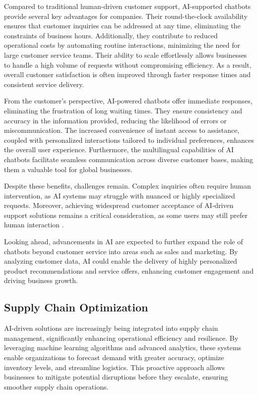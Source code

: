 Compared to traditional human-driven customer support, AI-supported chatbots provide several key advantages for companies. Their round-the-clock availability ensures that customer inquiries can be addressed at any time, eliminating the constraints of business hours. Additionally, they contribute to reduced operational costs by automating routine interactions, minimizing the need for large customer service teams. Their ability to scale effortlessly allows businesses to handle a high volume of requests without compromising efficiency. As a result, overall customer satisfaction is often improved through faster response times and consistent service delivery.  

From the customer's perspective, AI-powered chatbots offer immediate responses, eliminating the frustration of long waiting times. They ensure consistency and accuracy in the information provided, reducing the likelihood of errors or miscommunication. The increased convenience of instant access to assistance, coupled with personalized interactions tailored to individual preferences, enhances the overall user experience. Furthermore, the multilingual capabilities of AI chatbots facilitate seamless communication across diverse customer bases, making them a valuable tool for global businesses.  

Despite these benefits, challenges remain. Complex inquiries often require human intervention, as AI systems may struggle with nuanced or highly specialized requests. Moreover, achieving widespread customer acceptance of AI-driven support solutions remains a critical consideration, as some users may still prefer human interaction \cite{Customer-Service-AI-Chatbots}.  

Looking ahead, advancements in AI are expected to further expand the role of chatbots beyond customer service into areas such as sales and marketing. By analyzing customer data, AI could enable the delivery of highly personalized product recommendations and service offers, enhancing customer engagement and driving business growth.


\subsection{Supply Chain Optimization}
\label{subsec:supply-chain-optimization}
AI-driven solutions are increasingly being integrated into supply chain management, significantly enhancing operational efficiency and resilience. By leveraging machine learning algorithms and advanced analytics, these systems enable organizations to forecast demand with greater accuracy, optimize inventory levels, and streamline logistics. This proactive approach allows businesses to mitigate potential disruptions before they escalate, ensuring smoother supply chain operations.

